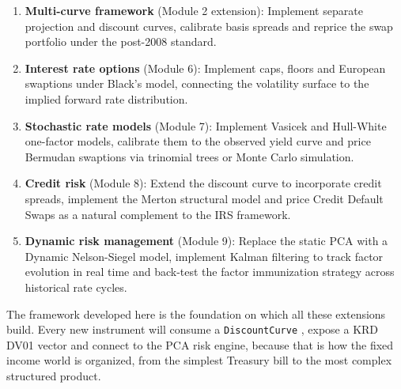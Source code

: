 \documentclass{article}
\theoremstyle{definition}  %
\theoremstyle{plain}  %
\numberwithin{definition}{section}
\numberwithin{proposition}{section}
\numberwithin{theorem}{section}
\numberwithin{equation}{section}
\begin{document}
\begin{enumerate}
    \item \textbf{Multi-curve framework} (Module 2 extension): Implement separate projection and discount curves, calibrate basis spreads and reprice the swap portfolio under the post-2008 standard.
    
    \item \textbf{Interest rate options} (Module 6): Implement caps, floors and European swaptions under Black's model, connecting the volatility surface to the implied forward rate distribution.
    
    \item \textbf{Stochastic rate models} (Module 7): Implement Vasicek and Hull-White one-factor models, calibrate them to the observed yield curve and price Bermudan swaptions via trinomial trees or Monte Carlo simulation.
    
    \item \textbf{Credit risk} (Module 8): Extend the discount curve to incorporate credit spreads, implement the Merton structural model and price Credit Default Swaps as a natural complement to the IRS framework.
    
    \item \textbf{Dynamic risk management} (Module 9): Replace the static PCA with a Dynamic Nelson-Siegel model, implement Kalman filtering to track factor evolution in real time and back-test the factor immunization strategy across historical rate cycles.
\end{enumerate}

The framework developed here is the foundation on which all these extensions build. Every new instrument will consume a \color{codegreen} \texttt{DiscountCurve} \color{black}, expose a KRD DV01 vector and connect to the PCA risk engine, because that is how the fixed income world is organized, from the simplest Treasury bill to the most complex structured product.

\newpage



\end{document}
